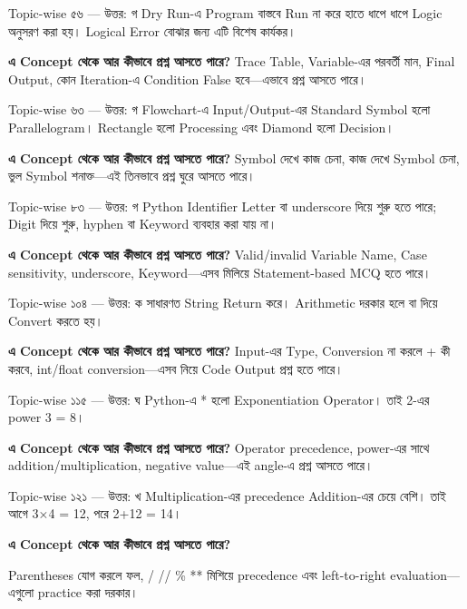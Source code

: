 \begin{explainbox}{Topic-wise ৫৬ — উত্তর: গ}
Dry Run-এ Program বাস্তবে Run না করে হাতে ধাপে ধাপে Logic অনুসরণ করা হয়। Logical Error বোঝার জন্য এটি বিশেষ কার্যকর।

\textbf{এ Concept থেকে আর কীভাবে প্রশ্ন আসতে পারে?} Trace Table, Variable-এর পরবর্তী মান, Final Output, কোন Iteration-এ Condition False হবে—এভাবে প্রশ্ন আসতে পারে।
\end{explainbox}

\begin{explainbox}{Topic-wise ৬৩ — উত্তর: গ}
Flowchart-এ Input/Output-এর Standard Symbol হলো Parallelogram। Rectangle হলো Processing এবং Diamond হলো Decision।

\textbf{এ Concept থেকে আর কীভাবে প্রশ্ন আসতে পারে?} Symbol দেখে কাজ চেনা, কাজ দেখে Symbol চেনা, ভুল Symbol শনাক্ত—এই তিনভাবে প্রশ্ন ঘুরে আসতে পারে।
\end{explainbox}

\begin{explainbox}{Topic-wise ৮৩ — উত্তর: গ}
Python Identifier Letter বা underscore দিয়ে শুরু হতে পারে; Digit দিয়ে শুরু, hyphen বা Keyword ব্যবহার করা যায় না।

\textbf{এ Concept থেকে আর কীভাবে প্রশ্ন আসতে পারে?} Valid/invalid Variable Name, Case sensitivity, underscore, Keyword—এসব মিলিয়ে Statement-based MCQ হতে পারে।
\end{explainbox}

\begin{explainbox}{Topic-wise ১০৪ — উত্তর: ক}
 সাধারণত String Return করে। Arithmetic দরকার হলে  বা  দিয়ে Convert করতে হয়।

\textbf{এ Concept থেকে আর কীভাবে প্রশ্ন আসতে পারে?} Input-এর Type, Conversion না করলে + কী করবে, int/float conversion—এসব নিয়ে Code Output প্রশ্ন হতে পারে।
\end{explainbox}

\begin{explainbox}{Topic-wise ১১৫ — উত্তর: ঘ}
Python-এ \textenglish{\ttfamily **} হলো Exponentiation Operator। তাই 2-এর power 3 = 8।

\textbf{এ Concept থেকে আর কীভাবে প্রশ্ন আসতে পারে?} Operator precedence, power-এর সাথে addition/multiplication, negative value—এই angle-এ প্রশ্ন আসতে পারে।
\end{explainbox}

\begin{explainbox}{Topic-wise ১২১ — উত্তর: খ}
Multiplication-এর precedence Addition-এর চেয়ে বেশি। তাই আগে 3×4 = 12, পরে 2+12 = 14।

\textbf{এ Concept থেকে আর কীভাবে প্রশ্ন আসতে পারে?}\par Parentheses যোগ করলে ফল, / // \% ** মিশিয়ে precedence এবং left-to-right evaluation—এগুলো practice করা দরকার।
\end{explainbox}

